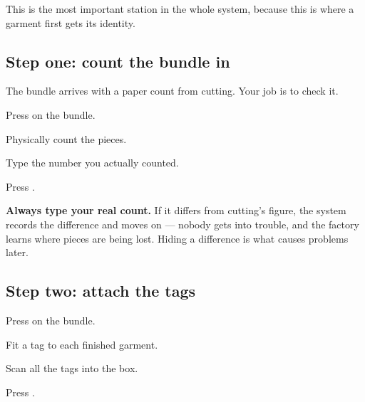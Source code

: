This is the most important station in the whole system, because this is where a
garment first gets its identity.


\subsection{Step one: count the bundle in}

The bundle arrives with a paper count from cutting. Your job is to check it.

\begin{steps}
  \item Press  on the bundle.
  \item Physically count the pieces.
  \item Type the number you actually counted.
  \item Press .
\end{steps}


\begin{tipbox}
\textbf{Always type your real count.} If it differs from cutting's figure, the
system records the difference and moves on --- nobody gets into trouble, and the
factory learns where pieces are being lost. Hiding a difference is what causes
problems later.
\end{tipbox}

\subsection{Step two: attach the tags}

\begin{steps}
  \item Press  on the bundle.
  \item Fit a tag to each finished garment.
  \item Scan all the tags into the box.
  \item Press .
\end{steps}


